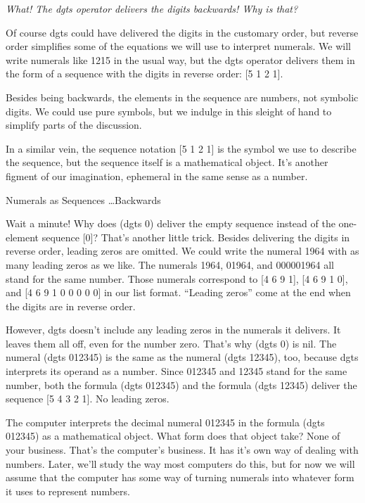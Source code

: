 \begin{aside}
\emph{What! The dgts operator delivers the digits backwards! Why is that?}

Of course
dgts
could have delivered the digits in the
customary order, but reverse order simplifies some of the
equations we will use to interpret numerals.
We will write numerals like 1215 in the usual way, but
the dgts operator delivers them in the form of
a sequence with the digits in reverse order: [5 1 2 1].

Besides being backwards, the elements in the sequence are numbers,
not symbolic digits.
We could use pure symbols, but we indulge in
this sleight of hand to
simplify parts of the discussion.

In a similar vein, the sequence notation [5 1 2 1] is the symbol we use
to describe the sequence,
but the sequence itself is a mathematical object.
It's another figment of our imagination,
ephemeral in the same sense as a number.
\caption{Numerals as Sequences \dots Backwards}
\label{numeral-as-sequence}
\end{aside}

Wait a minute!
Why does (dgts 0) deliver the empty sequence instead of the one-element sequence [0]?
That's another little trick.
Besides delivering the digits in reverse order,
leading zeros are omitted.
We could write the numeral 1964 with as many leading zeros as we like.
The numerals 1964, 01964, and 000001964 all stand for the same number.
Those numerals correspond to [4 6 9 1], [4 6 9 1 0], and [4 6 9 1 0 0 0 0 0] 
in our list format. ``Leading zeros'' come at the end when the
digits are in reverse order.

However, dgts doesn't include any
 leading zeros
in the numerals it delivers.
It leaves them all off, even for the number zero.
That's why (dgts 0) is nil.
The numeral (dgts 012345) is the same as the numeral (dgts 12345), too,
because dgts interprets its operand as a number.
Since 012345 and 12345 stand for the same number,
both the formula (dgts 012345) and the formula (dgts 12345) 
deliver the sequence [5 4 3 2 1].
No leading zeros.

The computer interprets the decimal numeral 012345 in the formula (dgts 012345)
as a mathematical object.
What form does that object take? None of your business.
That's the computer's business.
It has it's own way of dealing with numbers.
Later, we'll study the way most computers do this,
but for now we will assume that the computer has some way of turning
numerals into whatever form it uses to represent numbers.

